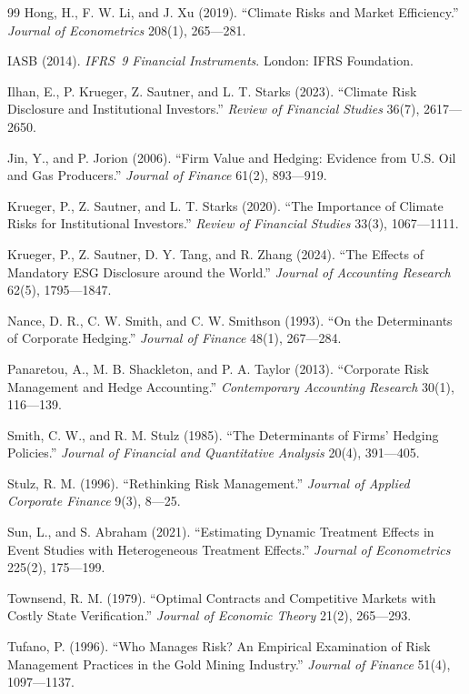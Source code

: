 \documentclass[11pt,a4paper]{article}
\begin{document}
\begin{thebibliography}{99}
 Hong, H., F. W. Li, and J. Xu (2019). ``Climate Risks and Market Efficiency.'' \emph{Journal of Econometrics} 208(1), 265---281.

 IASB (2014). \emph{IFRS~9 Financial Instruments}. London: IFRS Foundation.

 Ilhan, E., P. Krueger, Z. Sautner, and L. T. Starks (2023). ``Climate Risk Disclosure and Institutional Investors.'' \emph{Review of Financial Studies} 36(7), 2617---2650.

 Jin, Y., and P. Jorion (2006). ``Firm Value and Hedging: Evidence from U.S. Oil and Gas Producers.'' \emph{Journal of Finance} 61(2), 893---919.

 Krueger, P., Z. Sautner, and L. T. Starks (2020). ``The Importance of Climate Risks for Institutional Investors.'' \emph{Review of Financial Studies} 33(3), 1067---1111.

 Krueger, P., Z. Sautner, D. Y. Tang, and R. Zhang (2024). ``The Effects of Mandatory ESG Disclosure around the World.'' \emph{Journal of Accounting Research} 62(5), 1795---1847.

 Nance, D. R., C. W. Smith, and C. W. Smithson (1993). ``On the Determinants of Corporate Hedging.'' \emph{Journal of Finance} 48(1), 267---284.

 Panaretou, A., M. B. Shackleton, and P. A. Taylor (2013). ``Corporate Risk Management and Hedge Accounting.'' \emph{Contemporary Accounting Research} 30(1), 116---139.

 Smith, C. W., and R. M. Stulz (1985). ``The Determinants of Firms' Hedging Policies.'' \emph{Journal of Financial and Quantitative Analysis} 20(4), 391---405.

 Stulz, R. M. (1996). ``Rethinking Risk Management.'' \emph{Journal of Applied Corporate Finance} 9(3), 8---25.

 Sun, L., and S. Abraham (2021). ``Estimating Dynamic Treatment Effects in Event Studies with Heterogeneous Treatment Effects.'' \emph{Journal of Econometrics} 225(2), 175---199.

 Townsend, R. M. (1979). ``Optimal Contracts and Competitive Markets with Costly State Verification.'' \emph{Journal of Economic Theory} 21(2), 265---293.

 Tufano, P. (1996). ``Who Manages Risk? An Empirical Examination of Risk Management Practices in the Gold Mining Industry.'' \emph{Journal of Finance} 51(4), 1097---1137.

\end{thebibliography}
\end{document}
